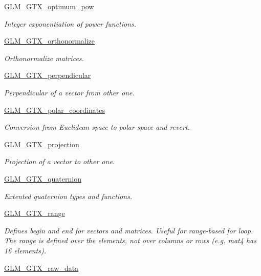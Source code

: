 \begin{DoxyCompactItemize}
\hyperlink{group__gtx__optimum__pow}{G\-L\-M\-\_\-\-G\-T\-X\-\_\-optimum\-\_\-pow}
\begin{DoxyCompactList}\small\item\em Integer exponentiation of power functions. \end{DoxyCompactList}\item 
\hyperlink{group__gtx__orthonormalize}{G\-L\-M\-\_\-\-G\-T\-X\-\_\-orthonormalize}
\begin{DoxyCompactList}\small\item\em Orthonormalize matrices. \end{DoxyCompactList}\item 
\hyperlink{group__gtx__perpendicular}{G\-L\-M\-\_\-\-G\-T\-X\-\_\-perpendicular}
\begin{DoxyCompactList}\small\item\em Perpendicular of a vector from other one. \end{DoxyCompactList}\item 
\hyperlink{group__gtx__polar__coordinates}{G\-L\-M\-\_\-\-G\-T\-X\-\_\-polar\-\_\-coordinates}
\begin{DoxyCompactList}\small\item\em Conversion from Euclidean space to polar space and revert. \end{DoxyCompactList}\item 
\hyperlink{group__gtx__projection}{G\-L\-M\-\_\-\-G\-T\-X\-\_\-projection}
\begin{DoxyCompactList}\small\item\em Projection of a vector to other one. \end{DoxyCompactList}\item 
\hyperlink{group__gtx__quaternion}{G\-L\-M\-\_\-\-G\-T\-X\-\_\-quaternion}
\begin{DoxyCompactList}\small\item\em Extented quaternion types and functions. \end{DoxyCompactList}\item 
\hyperlink{group__gtx__range}{G\-L\-M\-\_\-\-G\-T\-X\-\_\-range}
\begin{DoxyCompactList}\small\item\em Defines begin and end for vectors and matrices. Useful for range-\/based for loop. The range is defined over the elements, not over columns or rows (e.\-g. mat4 has 16 elements). \end{DoxyCompactList}\item 
\hyperlink{group__gtx__raw__data}{G\-L\-M\-\_\-\-G\-T\-X\-\_\-raw\-\_\-data}

\end{DoxyCompactItemize}
